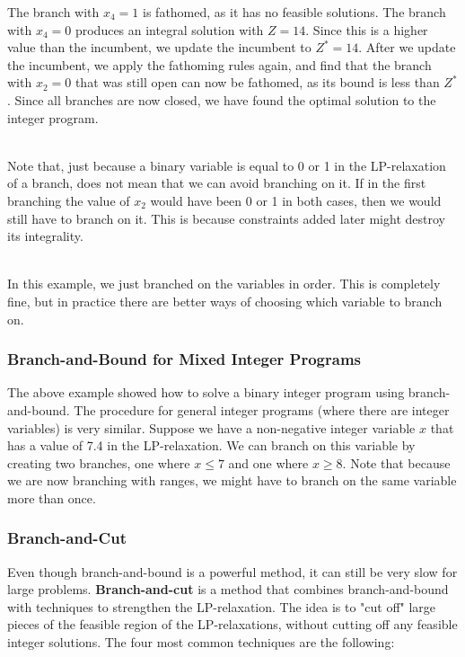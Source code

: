 \documentclass[12pt]{article}
\begin{document}
\noindent
The branch with $x_4 = 1$ is fathomed, as it has no feasible solutions.
The branch with $x_4 = 0$ produces an integral solution with $Z = 14$.
Since this is a higher value than the incumbent, we update the incumbent to $Z^* = 14$.
After we update the incumbent, we apply the fathoming rules again, and find that the branch with $x_2 = 0$ that was still open can now be fathomed, as its bound is less than $Z^*$.
Since all branches are now closed, we have found the optimal solution to the integer program.

\noindent
\\
Note that, just because a binary variable is equal to 0 or 1 in the LP-relaxation of a branch, does not mean that we can avoid branching on it.
If in the first branching the value of $x_2$ would have been 0 or 1 in both cases, then we would still have to branch on it.
This is because constraints added later might destroy its integrality.

\noindent
\\
In this example, we just branched on the variables in order.
This is completely fine, but in practice there are better ways of choosing which variable to branch on.

\newpage
\subsubsection{Branch-and-Bound for Mixed Integer Programs}
The above example showed how to solve a binary integer program using branch-and-bound.
The procedure for general integer programs (where there are integer variables) is very similar.
Suppose we have a non-negative integer variable $x$ that has a value of 7.4 in the LP-relaxation.
We can branch on this variable by creating two branches, one where $x \leq 7$ and one where $x \geq 8$.
Note that because we are now branching with ranges, we might have to branch on the same variable more than once.

\subsubsection{Branch-and-Cut}
Even though branch-and-bound is a powerful method, it can still be very slow for large problems.
\textbf{Branch-and-cut} is a method that combines branch-and-bound with techniques to strengthen the LP-relaxation.
The idea is to "cut off" large pieces of the feasible region of the LP-relaxations, without cutting off any feasible integer solutions.
The four most common techniques are the following:
\end{document}
